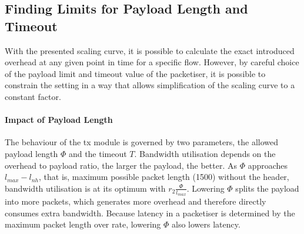 \subsection{Finding Limits for Payload Length and Timeout}
With the presented scaling curve, it is possible to calculate the exact introduced overhead at any given point in time for a specific flow.
However, by careful choice of the payload limit and timeout value of the packetiser, it is possible to constrain the setting in a way that allows simplification of the scaling curve to a constant factor.
\paragraph{Impact of Payload Length}
The behaviour of the \gls{tx} module is governed by two parameters, the allowed payload length
$\Phi $ and the timeout $T$. Bandwidth utilisation depends on the overhead to payload ratio, the larger the payload, the better.
As $\Phi$ approaches $l_{max} - l_{nh}$, that is, maximum possible packet length (\SI{1500}{\byte}) without the header, bandwidth utilisation is at its optimum with $r_2\frac{\Phi}{l_{max}}$.
Lowering $\Phi$ splits the payload into more packets, which generates more overhead
and therefore directly consumes extra bandwidth. Because latency in a packetiser is determined by the maximum packet length over rate, lowering $\Phi$ also lowers latency.
